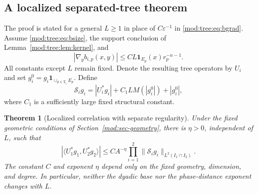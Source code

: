 \documentclass[11pt]{article}
\numberwithin{equation}{section}
\newtheorem{theorem}{Theorem}[section]
\theoremstyle{remark}
\theoremstyle{definition}
\newcommand{\norm}[1]{\lVert #1\rVert}
\newcommand{\TT}{\mathfrak T}
\begin{document}
\subsection{A localized separated-tree theorem}\label{mod:sec-local-correlation}\label{mod:tree:sec:local}
The proof is stated for a general $L\ge1$ in place of $C\varepsilon^{-1}$ in \eqref{mod:tree:eq:bgrad}. Assume \eqref{mod:tree:eq:bsize}, the support conclusion of Lemma~\ref{mod:tree:lem:kernel}, and
\begin{equation}\label{mod:tree:eq:Lgrad}
 |\nabla_yb_{i,p}(x,y)|\le C L\mathbf1_{E_p}(x)r_p^{-n-1}.
\end{equation}
All constants except $L$ remain fixed. Denote the resulting tree operators by $U_i$ and set $g_i^0=g_i\mathbf1_{\cup_{p\in\TT_i}E_p}$.
Define
\begin{equation}\label{mod:tree:eq:majorant}
 \mathscr S_i g_i
 =|U_i^*g_i|+C_1L M(|g_i^0|)+|g_i^0|,
\end{equation}
where $C_1$ is a sufficiently large fixed structural constant.

\begin{theorem}[Localized correlation with separate regularity]\label{mod:tree:thm:local}
Under the fixed geometric conditions of Section~\ref{mod:sec-geometry}, there is $\eta>0$, independent of $L$, such that
\begin{equation}\label{mod:tree:eq:local-correlation}
 |\langle U_1^*g_1,U_2^*g_2\rangle|
 \le CA^{-\eta}
 \prod_{i=1}^{2}\norm{\mathscr S_i g_i}_{L^2(I_1\cap I_2)}.
\end{equation}
The constant $C$ and exponent $\eta$ depend only on the fixed geometry, dimension, and degree. In particular, neither the dyadic base nor the phase-distance exponent changes with $L$.
\end{theorem}
\end{document}

